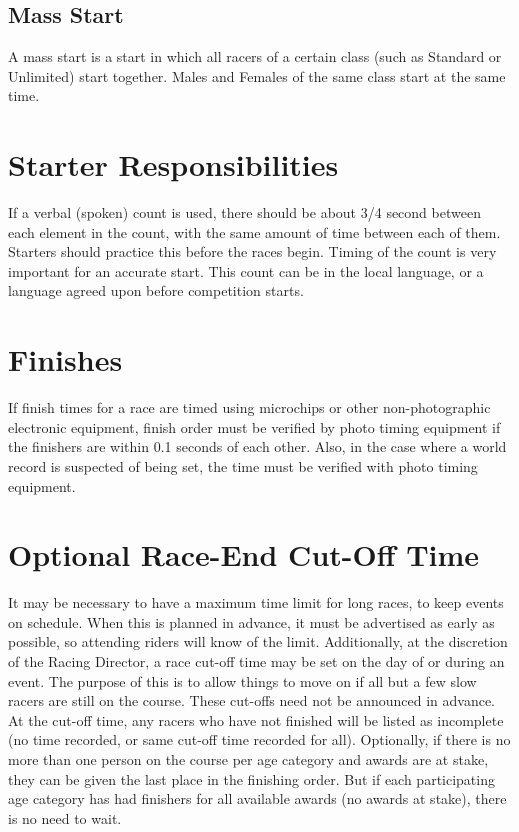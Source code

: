 \subsection{Mass Start \label{subsec:road_heat-assignment_mass-start}}

A mass start is a start in which all racers of a certain class (such as Standard or Unlimited) start together.
Males and Females of the same class start at the same time.

\section{Starter Responsibilities}

If a verbal (spoken) count is used, there should be about 3/4 second between each element in the count, with the same amount of time between each of them.
Starters should practice this before the races begin.
Timing of the count is very important for an accurate start.
This count can be in the local language, or a language agreed upon before competition starts.

\section{Finishes}

If finish times for a race are timed using microchips or other non-photographic electronic equipment, finish order must be verified by photo timing equipment if the finishers are within 0.1 seconds of each other.
Also, in the case where a world record is suspected of being set, the time must be verified with photo timing equipment.

\section{Optional Race-End Cut-Off Time}

It may be necessary to have a maximum time limit for long races, to keep events on schedule.
When this is planned in advance, it must be advertised as early as possible, so attending riders will know of the limit.
Additionally, at the discretion of the Racing Director, a race cut-off time may be set on the day of or during an event.
The purpose of this is to allow things to move on if all but a few slow racers are still on the course.
These cut-offs need not be announced in advance.
At the cut-off time, any racers who have not finished will be listed as incomplete (no time recorded, or same cut-off time recorded for all).
Optionally, if there is no more than one person on the course per age category and awards are at stake, they can be given the last place in the finishing order.
But if each participating age category has had finishers for all available awards (no awards at stake), there is no need to wait.


